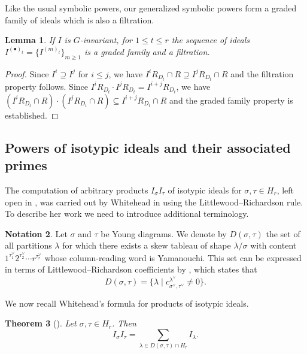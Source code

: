 \documentclass[11pt, reqno]{amsart}
\numberwithin{equation}{section}
\newtheorem{theorem}{Theorem}[section]
\newtheorem{lemma}[theorem]{Lemma}
\theoremstyle{definition}
\newtheorem{notation}[theorem]{Notation}
\begin{document}
Like the usual symbolic powers, our generalized symbolic powers form a graded family of ideals which is also a filtration.

\begin{lemma}\label{lem: generalized symbolic powers graded}
If $I$ is $G$-invariant, for  $1\leq t\leq r$ the sequence of ideals $I^{(\bullet)_t}=\{I^{(m)_t}\}_{m\geq 1}$ is a graded family and a filtration.
\end{lemma}
\begin{proof}
Since $I^i\supseteq I^j$ for $i\leq j$, we have $I^iR_{D_t}\cap R\supseteq I^j R_{D_t} \cap R$ and the filtration property follows. Since $I^iR_{D_t}\cdot I^j R_{D_t}=I^{i+j}R_{D_t}$, we have $(I^iR_{D_t}\cap R)\cdot (I^j R_{D_t} \cap R)\subseteq I^{i+j}R_{D_t}\cap R$ and the graded family property is established.
\end{proof}

\subsection{Powers of isotypic ideals and their associated primes}

The computation of arbitrary products $I_\sigma I_\tau$ of isotypic ideals  for  $\sigma, \tau\in H_r$, left open  in \cite{deconcini1980young},   was carried out by Whitehead in \cite{WhiteheadThesis} using the Littlewood--Richardson rule. To describe her work we need to introduce additional terminology.

\begin{notation}\label{def: D}
Let $\sigma$ and $\tau$ be Young diagrams.
We denote by $D(\sigma,\tau)$ the set of all partitions $\lambda$ for which there exists a skew tableau of shape $\lambda/\sigma$ with content
$
1^{\tau^\vee_1}2^{\tau^\vee_2}\cdots r^{\tau^\vee_r}
$
whose column-reading word is Yamanouchi. This set can be expressed in terms of Littlewood--Richardson coefficients by  , which states that
\[
D(\sigma,\tau)
=\{\lambda \mid c^{\lambda^\vee}_{\sigma^\vee, \tau^\vee}\neq 0\}.
\]
\end{notation}

We now recall Whitehead's formula for products of isotypic ideals.

\begin{theorem}[{\cite[Theorem 7.2]{WhiteheadThesis}}]\label{theorem: product whitehead}
Let $\sigma,\tau\in H_r$. Then
\[
I_\sigma I_\tau
=\sum_{\lambda\in D(\sigma,\tau)\cap H_r}I_\lambda.
\]
\end{theorem}
\end{document}
